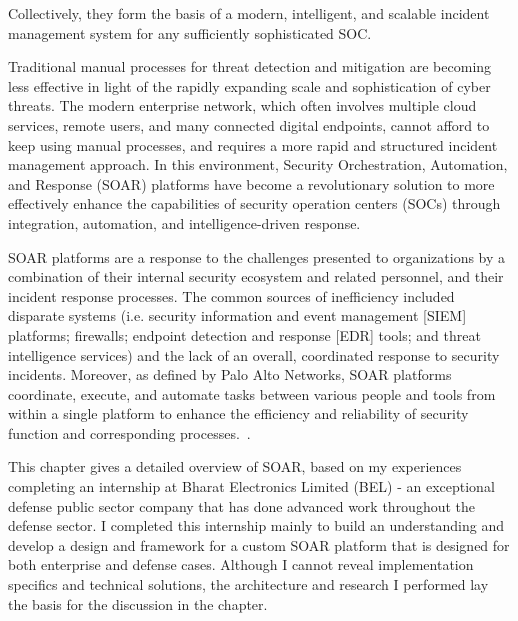 Collectively, they form the basis of a modern, intelligent, and scalable incident management system for any sufficiently sophisticated SOC.

Traditional manual processes for threat detection and mitigation are becoming less effective in light of the rapidly expanding scale and sophistication of cyber threats. The modern enterprise network, which often involves multiple cloud services, remote users, and many connected digital endpoints, cannot afford to keep using manual processes, and requires a more rapid and structured incident management approach. In this environment, Security Orchestration, Automation, and Response (SOAR) platforms have become a revolutionary solution to more effectively enhance the capabilities of security operation centers (SOCs) through integration, automation, and intelligence-driven response.

SOAR platforms are a response to the challenges presented to organizations by a combination of their internal security ecosystem and related personnel, and their incident response processes. The common sources of inefficiency included disparate systems (i.e. security information and event management [SIEM] platforms; firewalls; endpoint detection and response [EDR] tools; and threat intelligence services) and the lack of an overall, coordinated response to security incidents. Moreover, as defined by Palo Alto Networks, SOAR platforms coordinate, execute, and automate tasks between various people and tools from within a single platform to enhance the efficiency and reliability of security function and corresponding processes.~\cite{paloalto}.

This chapter gives a detailed overview of SOAR, based on my experiences completing an internship at Bharat Electronics Limited (BEL) - an exceptional defense public sector company that has done advanced work throughout the defense sector. I completed this internship mainly to build an understanding and develop a design and framework for a custom SOAR platform that is designed for both enterprise and defense cases. Although I cannot reveal implementation specifics and technical solutions, the architecture and research I performed lay the basis for the discussion in the chapter. 

